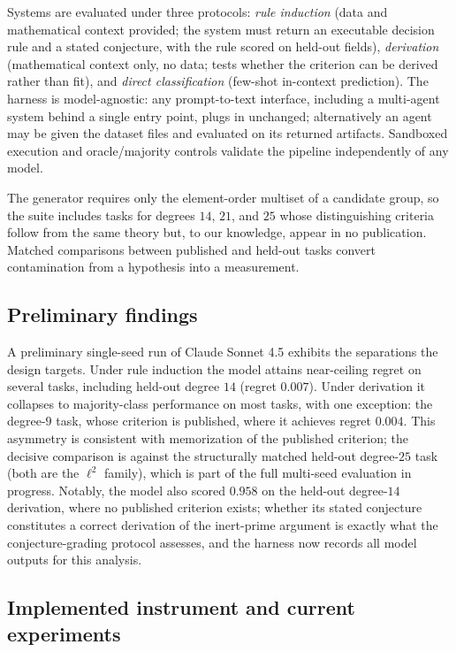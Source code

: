 \documentclass[10pt]{article}
\begin{document}
Systems are evaluated under three protocols: \emph{rule induction}
(data and mathematical context provided; the system must return an
executable decision rule and a stated conjecture, with the rule scored
on held-out fields), \emph{derivation} (mathematical context only, no
data; tests whether the criterion can be derived rather than fit), and
\emph{direct classification} (few-shot in-context prediction). The
harness is model-agnostic: any prompt-to-text interface, including a
multi-agent system behind a single entry point, plugs in unchanged;
alternatively an agent may be given the dataset files and evaluated on
its returned artifacts. Sandboxed execution and oracle/majority
controls validate the pipeline independently of any model.

The generator requires only the element-order multiset of a candidate
group, so the suite includes tasks for degrees $14$, $21$, and $25$
whose distinguishing criteria follow from the same theory but, to our
knowledge, appear in no publication. Matched comparisons between
published and held-out tasks convert contamination from a hypothesis
into a measurement.

\subsection*{Preliminary findings}

A preliminary single-seed run of Claude Sonnet 4.5 exhibits the
separations the design targets. Under rule induction the model attains
near-ceiling regret on several tasks, including held-out degree $14$
(regret $0.007$). Under derivation it collapses to majority-class
performance on most tasks, with one exception: the degree-$9$ task,
whose criterion is published, where it achieves regret $0.004$. This
asymmetry is consistent with memorization of the published criterion;
the decisive comparison is against the structurally matched held-out
degree-$25$ task (both are the $\ell^2$ family), which is part of the
full multi-seed evaluation in progress. Notably, the model also scored
$0.958$ on the held-out degree-$14$ derivation, where no published
criterion exists; whether its stated conjecture constitutes a correct
derivation of the inert-prime argument is exactly what the
conjecture-grading protocol assesses, and the harness now records all
model outputs for this analysis.

\subsection*{Implemented instrument and current experiments}
\end{document}
